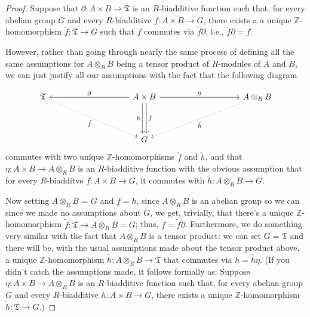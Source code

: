\documentclass[12pt,reqno]{amsart}
\theoremstyle{plain}
\newcommand{\zz}{\mathbb Z}
\begin{document}
\begin{proof} Suppose that $\partial \colon A \times B \to \mathfrak{T}$ is an $R$-biadditive function such that, for every abelian group $G$ and every $R$-biadditive $f \colon A \times B \to G$, there exists a a unique $\zz$-homomorphism $\tilde{f} \colon \mathfrak{T} \to G$ such that $f$ commutes via $\tilde{f} \partial$, i.e., $\tilde{f} \partial = f$.

However, rather than going through nearly the same process of defining all the same assumptions for $A \otimes_R B$ being a tensor product of $R$-modules of $A$ and $B$, we can just justify all our assumptions with the fact that the following diagram 

$$\begin{tikzcd}
\mathfrak{T} \arrow[rrrrdd, "\tilde{f}"', dotted] &  &  &  & A\times B \arrow[rrrr, "\eta"] \arrow[llll, "\partial"'] \arrow[dd, "h"', shift right] \arrow[dd, "f", shift left] &  &  &  & A \otimes_R B \arrow[lllldd, "\tilde{h}", dotted] \\
                               &  &  &  &                                                                                                  &  &  &  &                               \\
                               &  &  &  & G                                                                                                &  &  &  &                              
\end{tikzcd}$$ 
commutes with two unique $\zz$-homomorphisms $\tilde{f}$ and $\tilde{h}$, and that $\eta \colon A \times B \to A \otimes_R B$ is an $R$-biadditive function with the obvious assumption that for every $R$-biadditve $f \colon A \times B \to G$, it commutes with $\tilde{h} \colon A \otimes_R B \to G$. 

Now setting $ A \otimes_R B$ = $G$ and $f = h$, since $A \otimes_R B$ is an abelian group so we can since we made no assumptions about $G$, we get, trivially, that there's a unique $\zz$-homomorphism $\tilde{f} \colon \mathfrak{T} \to A \otimes_R B = G$; thus, $ f = \tilde{f} \partial$.  Furthermore, we do something very similar with the fact that $A \otimes_R B$ is a tensor product: we can set $G = \mathfrak{T}$ and there will be, with the usual assumptions made about the tensor product above,  a unique $\zz$-homomorphism $\tilde{h} \colon A \otimes_R B \to \mathfrak{T}$ that commutes via $h = \tilde{h} \eta$.  (If you didn't catch the assumptions made, it follows formally as: Suppose $\eta \colon A \times B \to A \otimes_R B $ is an $R$-biadditive function such that, for every abelian group $G$ and every $R$-biadditive $h \colon A \times B \to G$, there exists a unique $\zz$-homomorphism $\tilde{h} \colon \mathfrak{T} \to G$.) 


\end{proof}
\end{document}

